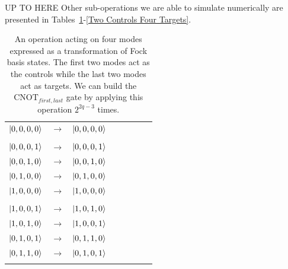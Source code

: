 \documentclass[aps,pra,twocolumn,showpacs,superscriptaddress,floatfix,10pt]{revtex4}
\begin{document}
UP TO HERE 
Other sub-operations we are able to simulate numerically are presented in Tables~\ref{Two Controls Two Targets}-\ref{Two Controls Four Targets}.
\begin {table}[h]
\begin{center}
	\begin{tabular}{l*{6}{c}r} 
		$\ket{0,0,0,0}$  &  $\rightarrow$ & $\ket{0,0,0,0}$ \\ \\
		$\ket{0,0,0,1}$  & $\rightarrow$ & $\ket{0,0,0,1}$ \\
		$\ket{0,0,1,0}$ & $\rightarrow$ & $\ket{0,0,1,0}$ \\
		$\ket{0,1,0,0}$ & $\rightarrow$ & $\ket{0,1,0,0} $ \\ 
		$\ket{1,0,0,0}$ & $\rightarrow$ & $\ket{1,0,0,0} $ \\ \\
		$\ket{1,0,0,1}$  & $\rightarrow$ & $\ket{1,0,1,0}$ \\
		$\ket{1,0,1,0}$ & $\rightarrow$ & $\ket{1,0,0,1}$ \\
		$\ket{0,1,0,1}$ & $\rightarrow$ & $\ket{0,1,1,0} $ \\ 
		$\ket{0,1,1,0}$ & $\rightarrow$ & $\ket{0,1,0,1} $ \\ \\
	\end{tabular}
	\caption{ \label{Two Controls Two Targets} An operation acting on four modes expressed as a transformation of Fock basis states. The first two modes act as the controls while the last two modes act as targets. We can build the $\mbox{CNOT}_{first,last}$ gate by applying this operation $2^{2 q - 3}$ times.}
\end{center}
\end{table}
\end{document}
